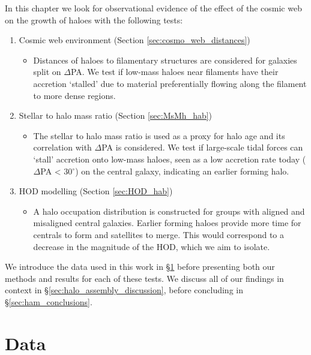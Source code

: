 In this chapter we look for observational evidence of the effect of the cosmic web on the growth of haloes with the following tests:
\begin{enumerate}
\item Cosmic web environment (Section \ref{sec:cosmo_web_distances})
\begin{itemize}
\item Distances of haloes to filamentary structures are considered for galaxies split on $\Delta$PA. We test if low-mass haloes near filaments have their accretion `stalled' due to material preferentially flowing along the filament to more dense regions. 
\end{itemize}
\item Stellar to halo mass ratio  (Section \ref{sec:MsMh_hab})
\begin{itemize}
\item The stellar to halo mass ratio is used as a proxy for halo age and its correlation with $\Delta$PA is considered. We test if large-scale tidal forces can `stall' accretion onto low-mass haloes, seen as a low accretion rate today ($\Delta$PA < 30$^{\circ}$) on the central galaxy, indicating an earlier forming halo.
\end{itemize}
\item HOD modelling (Section \ref{sec:HOD_hab})
\begin{itemize}
\item A halo occupation distribution is constructed for groups with aligned and misaligned central galaxies. Earlier forming haloes provide more time for centrals to form and satellites to merge. This would correspond to a decrease in the magnitude of the HOD, which we aim to isolate. 
\end{itemize}
\end{enumerate}
We introduce the data used in this work in \S\ref{sec:data_hab} before presenting both our methods and results for each of these tests. We discuss all of our findings in context in \S\ref{sec:halo_assembly_discussion}, before concluding in \S\ref{sec:ham_conclusions}.

\section{Data} \label{sec:data_hab}
